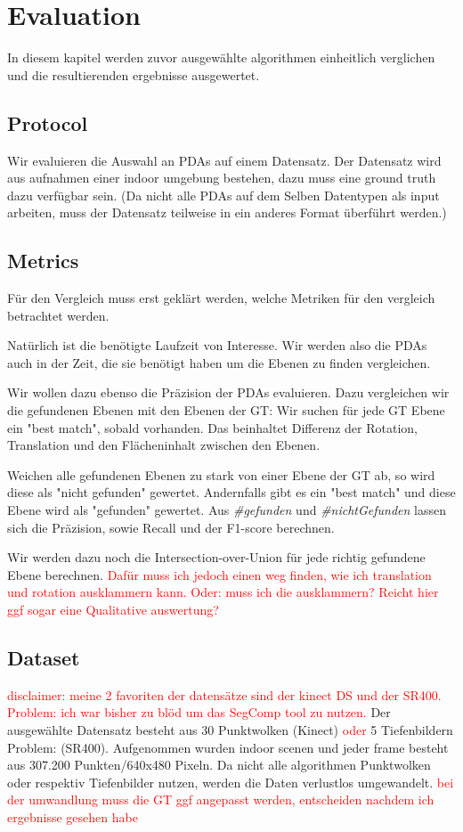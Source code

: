 \documentclass[main.tex]{subfiles}
\begin{document}
\chapter{Evaluation}

In diesem kapitel werden zuvor ausgewählte algorithmen einheitlich verglichen und die resultierenden ergebnisse ausgewertet.

\section{Protocol}
Wir evaluieren die Auswahl an PDAs auf einem Datensatz.
Der Datensatz wird aus aufnahmen einer indoor umgebung bestehen, dazu muss eine ground truth dazu verfügbar sein.
(Da nicht alle PDAs auf dem Selben Datentypen als input arbeiten, muss der Datensatz teilweise in ein anderes Format
überführt werden.)

\section{Metrics}
Für den Vergleich muss erst geklärt werden, welche Metriken für den vergleich betrachtet werden.

Natürlich ist die benötigte Laufzeit von Interesse. Wir werden also die PDAs auch in der Zeit, die sie benötigt haben
um die Ebenen zu finden vergleichen.

Wir wollen dazu ebenso die Präzision der PDAs evaluieren.
Dazu vergleichen wir die gefundenen Ebenen mit den Ebenen der GT:
Wir suchen für jede GT Ebene ein "best match", sobald vorhanden. Das beinhaltet Differenz der Rotation, Translation und
den Flächeninhalt zwischen den Ebenen.

Weichen alle gefundenen Ebenen zu stark von einer Ebene der GT ab, so wird diese als "nicht gefunden" gewertet.
Andernfalls gibt es ein "best match" und diese Ebene wird als "gefunden" gewertet.
Aus \textit{\#gefunden} und \textit{\#nichtGefunden} lassen sich die Präzision, sowie Recall und der F1-score berechnen.

Wir werden dazu noch die Intersection-over-Union für jede richtig gefundene Ebene berechnen.
\textcolor{red}{Dafür muss ich jedoch einen weg finden, wie ich translation und rotation ausklammern kann.
    Oder: muss ich die ausklammern? Reicht hier ggf sogar eine Qualitative auswertung?}

\section{Dataset}
\textcolor{red}{disclaimer: meine 2 favoriten der datensätze sind der kinect DS und der SR400.
    Problem: ich war bisher zu blöd um das SegComp tool zu nutzen.}
Der ausgewählte Datensatz besteht aus 30 Punktwolken (Kinect) \textcolor{red}{oder} 5 Tiefenbildern
Problem: (SR400).
Aufgenommen wurden indoor scenen und jeder frame besteht aus 307.200 Punkten/640x480 Pixeln.
Da nicht alle algorithmen Punktwolken oder respektiv Tiefenbilder nutzen, werden die Daten verlustlos umgewandelt.
\textcolor{red}{bei der umwandlung muss die GT ggf angepasst werden, entscheiden nachdem ich ergebnisse gesehen habe}
\end{document}
